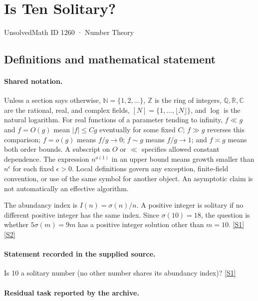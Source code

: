 \documentclass[11pt,a4paper]{article}
\newcommand{\N}{\mathbb{N}}
\newcommand{\Z}{\mathbb{Z}}
\newcommand{\Q}{\mathbb{Q}}
\newcommand{\R}{\mathbb{R}}
\newcommand{\C}{\mathbb{C}}
\newcommand{\sref}[2]{\hyperlink{source:#1:#2}{[S#2]}}
\begin{document}

\setcounter{section}{1259}

\section{Is Ten Solitary?}\label{1260}

{\small\sffamily UnsolvedMath ID 1260 · Number Theory}

\subsection{Definitions and mathematical statement}

\paragraph{Shared notation.}Unless a section says otherwise, $\N=\{1,2,\ldots\}$,
$\Z$ is the ring of integers, $\Q,\R,\C$ are the rational, real, and complex
fields, $[N]=\{1,\ldots,\lfloor N\rfloor\}$, and $\log$ is the natural
logarithm. For real functions of a parameter tending to infinity,
$f\ll g$ and $f=O(g)$ mean $|f|\leq Cg$ eventually for some fixed $C$;
$f\gg g$ reverses this comparison; $f=o(g)$ means $f/g\to0$;
$f\sim g$ means $f/g\to1$; and $f\asymp g$ means both order bounds.
A subscript on $O$ or $\ll$ specifies allowed constant dependence.
The expression $n^{o(1)}$ in an upper bound means growth smaller than
$n^\epsilon$ for each fixed $\epsilon>0$. Local definitions govern any
exception, finite-field convention, or use of the same symbol for another
object. An asymptotic claim is not automatically an effective algorithm.



The abundancy index is $I(n)=\sigma(n)/n$. A positive integer is solitary if no different positive integer has the same index. Since $\sigma(10)=18$, the question is whether $5\sigma(m)=9m$ has a positive integer solution other than $m=10$. \sref{1260}{1} \sref{1260}{2}

\paragraph{Statement recorded in the supplied source.}
Is 10 a solitary number (no other number shares its abundancy index)? \sref{1260}{1}

\paragraph{Residual task reported by the archive.}
\end{document}
